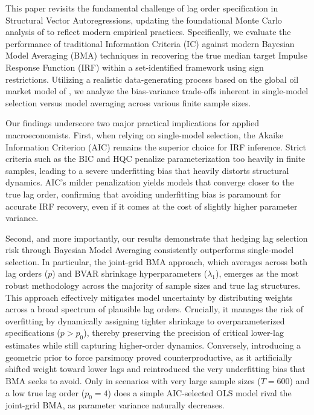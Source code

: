 \documentclass[12pt, a4paper]{article}
\begin{document}
This paper revisits the fundamental challenge of lag order specification in Structural Vector Autoregressions, updating the foundational Monte Carlo analysis of \citet{ivanovPractitionersGuideLag2005} to reflect modern empirical practices. Specifically, we evaluate the performance of traditional Information Criteria (IC) against modern Bayesian Model Averaging (BMA) techniques in recovering the true median target Impulse Response Function (IRF) within a set-identified framework using sign restrictions. Utilizing a realistic data-generating process based on the global oil market model of \citet{kilianRoleInventoriesSpeculative2014}, we analyze the bias-variance trade-offs inherent in single-model selection versus model averaging across various finite sample sizes.

Our findings underscore two major practical implications for applied macroeconomists. First, when relying on single-model selection, the Akaike Information Criterion (AIC) remains the superior choice for IRF inference. Strict criteria such as the BIC and HQC penalize parameterization too heavily in finite samples, leading to a severe underfitting bias that heavily distorts structural dynamics. AIC's milder penalization yields models that converge closer to the true lag order, confirming that avoiding underfitting bias is paramount for accurate IRF recovery, even if it comes at the cost of slightly higher parameter variance.

Second, and more importantly, our results demonstrate that hedging lag selection risk through Bayesian Model Averaging consistently outperforms single-model selection. In particular, the joint-grid BMA approach, which averages across both lag orders ($p$) and BVAR shrinkage hyperparameters ($\lambda_1$), emerges as the most robust methodology across the majority of sample sizes and true lag structures. This approach effectively mitigates model uncertainty by distributing weights across a broad spectrum of plausible lag orders. Crucially, it manages the risk of overfitting by dynamically assigning tighter shrinkage to overparameterized specifications ($p > p_0$), thereby preserving the precision of critical lower-lag estimates while still capturing higher-order dynamics. Conversely, introducing a geometric prior to force parsimony proved counterproductive, as it artificially shifted weight toward lower lags and reintroduced the very underfitting bias that BMA seeks to avoid. Only in scenarios with very large sample sizes ($T=600$) and a low true lag order ($p_0=4$) does a simple AIC-selected OLS model rival the joint-grid BMA, as parameter variance naturally decreases.
\end{document}
